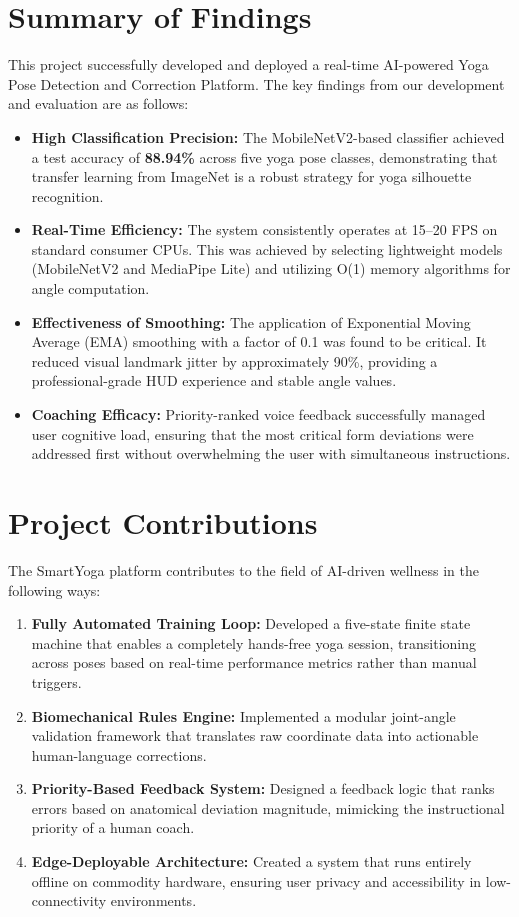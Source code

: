 
\section{Summary of Findings}
This project successfully developed and deployed a real-time AI-powered Yoga Pose Detection and Correction Platform. The key findings from our development and evaluation are as follows:
\begin{itemize}
    \item \textbf{High Classification Precision:} The MobileNetV2-based classifier achieved a test accuracy of \textbf{88.94\%} across five yoga pose classes, demonstrating that transfer learning from ImageNet is a robust strategy for yoga silhouette recognition.
    \item \textbf{Real-Time Efficiency:} The system consistently operates at 15--20 FPS on standard consumer CPUs. This was achieved by selecting lightweight models (MobileNetV2 and MediaPipe Lite) and utilizing O(1) memory algorithms for angle computation.
    \item \textbf{Effectiveness of Smoothing:} The application of Exponential Moving Average (EMA) smoothing with a factor of 0.1 was found to be critical. It reduced visual landmark jitter by approximately 90\%, providing a professional-grade HUD experience and stable angle values.
    \item \textbf{Coaching Efficacy:} Priority-ranked voice feedback successfully managed user cognitive load, ensuring that the most critical form deviations were addressed first without overwhelming the user with simultaneous instructions.
\end{itemize}

\section{Project Contributions}
The SmartYoga platform contributes to the field of AI-driven wellness in the following ways:
\begin{enumerate}
    \item \textbf{Fully Automated Training Loop:} Developed a five-state finite state machine that enables a completely hands-free yoga session, transitioning across poses based on real-time performance metrics rather than manual triggers.
    \item \textbf{Biomechanical Rules Engine:} Implemented a modular joint-angle validation framework that translates raw coordinate data into actionable human-language corrections.
    \item \textbf{Priority-Based Feedback System:} Designed a feedback logic that ranks errors based on anatomical deviation magnitude, mimicking the instructional priority of a human coach.
    \item \textbf{Edge-Deployable Architecture:} Created a system that runs entirely offline on commodity hardware, ensuring user privacy and accessibility in low-connectivity environments.
\end{enumerate}

